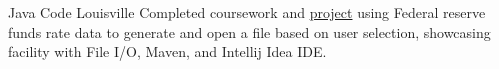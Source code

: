 {Java}{}{}
{Code Louisville}
{Completed coursework and \href{https://github.com/jacobarchambault/codeloujava}{project} using Federal reserve funds rate data to generate and open a file based on user selection, showcasing facility with 
	File I/O, Maven, and Intellij Idea IDE.}
